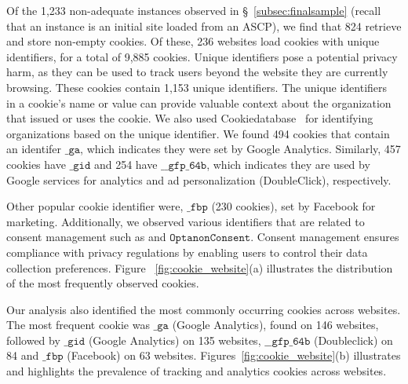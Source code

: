 Of the 1,233 non-adequate instances observed in \S~\ref{subsec:finalsample}
(recall that an instance is an initial site loaded from an ASCP),
we find that 824 retrieve and store non-empty cookies. 
Of these, 236 websites load cookies with unique identifiers, for a total of 9,885 cookies. 
Unique identifiers pose a potential privacy harm, as they can be used to track
users beyond the website they are currently browsing.
These cookies contain 1,153 unique identifiers. 
The unique identifiers~\cite{munir2023cookiegraph} in a cookie's name or value 
can provide valuable context about the organization that issued or uses the cookie. 
We also used Cookiedatabase~\cite{cookiedatabase} for identifying organizations based on the unique identifier.
We found 494 cookies that contain an identifer $\texttt{\_ga}$, 
which indicates they were set by Google Analytics. 
Similarly, 457 cookies have $\texttt{\_gid}$ and 254 have $\texttt{\_\_gfp\_64b}$, which indicates 
they are used by Google services for analytics and ad personalization (DoubleClick), respectively.

Other popular cookie identifier were, $\texttt{\_fbp}$ (230 cookies), 
set by Facebook for marketing. Additionally, we observed various identifiers 
that are related to consent management such as  and $\texttt{OptanonConsent}$.  
Consent management ensures compliance with privacy regulations by enabling users to control their data collection preferences.
Figure ~\ref{fig:cookie_website}(a) illustrates the distribution of the most frequently observed cookies.


Our analysis also identified the most commonly occurring cookies across websites. 
The most frequent cookie was $\texttt{\_ga}$ (Google Analytics), found on 146 websites, 
followed by $\texttt{\_gid}$ (Google Analytics) on 135 websites, $\texttt{\_\_gfp\_64b}$ (Doubleclick) 
on 84 and $\texttt{\_fbp}$ (Facebook) on 63 websites. 
Figures~\ref{fig:cookie_website}(b) illustrates and highlights the prevalence of tracking and analytics cookies across websites.





